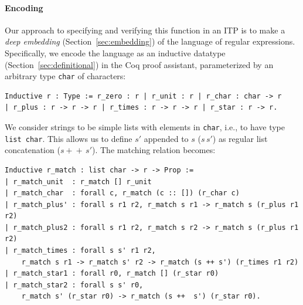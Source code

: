 \paragraph{Encoding} Our approach to specifying and verifying this function in an ITP is to make a \emph{deep embedding} (Section~\ref{sec:embedding}) of the language of regular expressions. Specifically, we encode the language as an inductive datatype (Section~\ref{sec:definitional}) in the Coq proof assistant, parameterized by an arbitrary type \lstinline{char} of characters:
\begin{lstlisting}[language=Coq]
Inductive r : Type := r_zero : r | r_unit : r | r_char : char -> r
| r_plus : r -> r -> r | r_times : r -> r -> r | r_star : r -> r.
\end{lstlisting}
We consider strings to be simple lists with elements in \lstinline{char}, i.e., to have type \lstinline{list char}. This allows us to define $s'$ appended to $s$ ($s\,s'$) as regular list concatenation ($s +\!\!\!+\, s'$). The matching relation becomes:
\begin{lstlisting}[language=Coq,keepspaces=true]
Inductive r_match : list char -> r -> Prop :=
| r_match_unit  : r_match [] r_unit
| r_match_char  : forall c, r_match (c :: []) (r_char c)
| r_match_plus' : forall s r1 r2, r_match s r1 -> r_match s (r_plus r1 r2)
| r_match_plus2 : forall s r1 r2, r_match s r2 -> r_match s (r_plus r1 r2)
| r_match_times : forall s s' r1 r2,
    r_match s r1 -> r_match s' r2 -> r_match (s ++ s') (r_times r1 r2)
| r_match_star1 : forall r0, r_match [] (r_star r0)
| r_match_star2 : forall s s' r0,
    r_match s' (r_star r0) -> r_match (s ++  s') (r_star r0).
\end{lstlisting}




